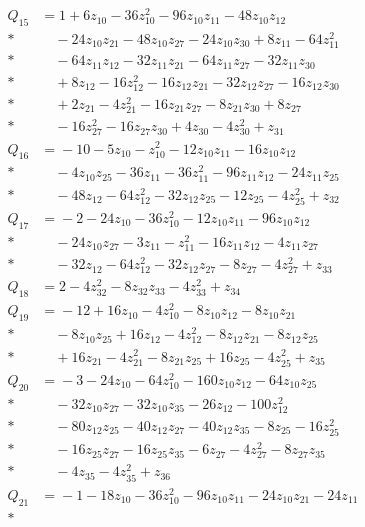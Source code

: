 \begin{align*}
Q_{15} &={}1 + 6z_{10} - 36z_{10}^{2} - 96z_{10}z_{11} - 48z_{10}z_{12}\\*
&\quad{} - 24z_{10}z_{21} - 48z_{10}z_{27} - 24z_{10}z_{30} + 8z_{11} - 64z_{11}^{2}\\*
&\quad{} - 64z_{11}z_{12} - 32z_{11}z_{21} - 64z_{11}z_{27} - 32z_{11}z_{30}\\*
&\quad{} + 8z_{12} - 16z_{12}^{2} - 16z_{12}z_{21} - 32z_{12}z_{27} - 16z_{12}z_{30}\\*
&\quad{} + 2z_{21} - 4z_{21}^{2} - 16z_{21}z_{27} - 8z_{21}z_{30} + 8z_{27}\\*
&\quad{} - 16z_{27}^{2} - 16z_{27}z_{30} + 4z_{30} - 4z_{30}^{2} + z_{31}\\[4pt]
Q_{16} &={}-10 - 5z_{10} - z_{10}^{2} - 12z_{10}z_{11} - 16z_{10}z_{12}\\*
&\quad{} - 4z_{10}z_{25} - 36z_{11} - 36z_{11}^{2} - 96z_{11}z_{12} - 24z_{11}z_{25}\\*
&\quad{} - 48z_{12} - 64z_{12}^{2} - 32z_{12}z_{25} - 12z_{25} - 4z_{25}^{2} + z_{32}\\[4pt]
Q_{17} &={}-2 - 24z_{10} - 36z_{10}^{2} - 12z_{10}z_{11} - 96z_{10}z_{12}\\*
&\quad{} - 24z_{10}z_{27} - 3z_{11} - z_{11}^{2} - 16z_{11}z_{12} - 4z_{11}z_{27}\\*
&\quad{} - 32z_{12} - 64z_{12}^{2} - 32z_{12}z_{27} - 8z_{27} - 4z_{27}^{2} + z_{33}\\[4pt]
Q_{18} &={}2 - 4z_{32}^{2} - 8z_{32}z_{33} - 4z_{33}^{2} + z_{34}\\[4pt]
Q_{19} &={}-12 + 16z_{10} - 4z_{10}^{2} - 8z_{10}z_{12} - 8z_{10}z_{21}\\*
&\quad{} - 8z_{10}z_{25} + 16z_{12} - 4z_{12}^{2} - 8z_{12}z_{21} - 8z_{12}z_{25}\\*
&\quad{} + 16z_{21} - 4z_{21}^{2} - 8z_{21}z_{25} + 16z_{25} - 4z_{25}^{2} + z_{35}\\[4pt]
Q_{20} &={}-3 - 24z_{10} - 64z_{10}^{2} - 160z_{10}z_{12} - 64z_{10}z_{25}\\*
&\quad{} - 32z_{10}z_{27} - 32z_{10}z_{35} - 26z_{12} - 100z_{12}^{2}\\*
&\quad{} - 80z_{12}z_{25} - 40z_{12}z_{27} - 40z_{12}z_{35} - 8z_{25} - 16z_{25}^{2}\\*
&\quad{} - 16z_{25}z_{27} - 16z_{25}z_{35} - 6z_{27} - 4z_{27}^{2} - 8z_{27}z_{35}\\*
&\quad{} - 4z_{35} - 4z_{35}^{2} + z_{36}\\[4pt]
Q_{21} &={}-1 - 18z_{10} - 36z_{10}^{2} - 96z_{10}z_{11} - 24z_{10}z_{21} - 24z_{11}\\*

\end{align*}
